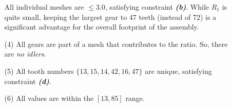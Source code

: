 \documentclass[12pt]{article}
\begin{document}
\begin{itemize}
\begin{itemize}
                    All individual meshes are $\leq 3.0$, satisfying constraint \textit{\textbf{(b)}}. While $R_1$ is quite small, keeping the largest gear to 47 teeth (instead of 72) is a significant advantage for the overall footprint of the assembly.

              \item [(4)] All gears are part of a mesh that contributes to the ratio. So, there are \textit{no idlers}.

              \item [(5)]  All tooth numbers $\{13, 15, 14, 42, 16, 47\}$ are unique, satisfying constraint \textit{\textbf{(d)}}.

              \item [(6)] All values are within the $[13, 85]$ range.

          \end{itemize}
\end{itemize}
\end{document}
